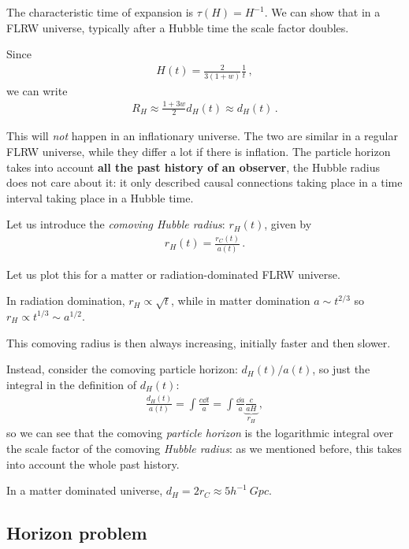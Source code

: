 \documentclass[main.tex]{subfiles}
\begin{document}
The characteristic time of expansion is \(\tau (H ) =H^{-1}\). 
We can show that in a FLRW universe, typically after a Hubble time the scale factor doubles. 

Since 
%
\begin{align}
H(t) = \frac{2}{3 (1+w)} \frac{1}{t} 
\,,
\end{align}
%
we can write
%
\begin{align}
R_H \approx \frac{1 + 3w}{2} d_H (t) \approx d_H (t)
\,.
\end{align}


This will \emph{not} happen in an inflationary universe.
The two are similar in a regular FLRW universe, while they differ a lot if there is inflation. 
The particle horizon takes into account \textbf{all the past history of an observer}, the Hubble radius does not care about it: it only described causal connections taking place in a time interval taking place in a Hubble time. 

Let us introduce the \emph{comoving Hubble radius}: \(r_H (t)\), given by 
%
\begin{align}
r_H (t) = \frac{r_C (t)}{a(t)}
\,.
\end{align}

Let us plot this for a matter or radiation-dominated FLRW universe.

In radiation domination, \(r_H \propto \sqrt{t}\), while in matter domination \(a \sim t^{2/3}\) so \(r_H \propto t^{1/3} \sim a^{1/2}\). 

This comoving radius is then always increasing, initially faster and then slower. 

Instead, consider the comoving particle horizon: \(d_H (t) / a(t)\), so just the integral in the definition of \(d_H(t)\): 
%
\begin{align}
\frac{d_H (t)}{a(t)} = \int \frac{c \dd{t}}{a} = \int \frac{ \dd{a}}{a} \underbrace{\frac{c}{a H}}_{r_H}
\,,
\end{align}
%
so we can see that the comoving \emph{particle horizon} is the logarithmic integral over the scale factor of the comoving \emph{Hubble radius}: as we mentioned before, this takes into account the whole past history. 

In a matter dominated universe, \(d_H = 2 r_C \approx 5 h^{-1} \SI{}{Gpc}\).

\subsection{Horizon problem}
\end{document}
